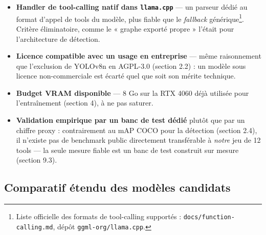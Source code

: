 \documentclass[11pt,a4paper]{article}
\let\Oldsubsection\subsection
\renewcommand{\subsection}{\FloatBarrier\Oldsubsection}
\begin{document}
    \begin{itemize}[leftmargin=1.5em]
      \item \textbf{Handler de tool-calling natif dans \texttt{llama.cpp}}
        --- un parseur dédié au format d'appel de tools du modèle, plus
        fiable que le \emph{fallback} générique\footnote{Liste officielle
        des formats de tool-calling supportés :
        \texttt{docs/function-calling.md}, dépôt
        \texttt{ggml-org/llama.cpp}.}. Critère éliminatoire, comme le «
        graphe exporté propre » l'était pour l'architecture de détection.
      \item \textbf{Licence compatible avec un usage en entreprise} ---
        même raisonnement que l'exclusion de YOLOv8n en AGPL-3.0
        (section 2.2) : un modèle sous licence non-commerciale est écarté
        quel que soit son mérite technique.
      \item \textbf{Budget VRAM disponible} --- 8 Go sur la RTX 4060 déjà
        utilisée pour l'entraînement (section 4), à ne pas saturer.
      \item \textbf{Validation empirique par un banc de test dédié} plutôt
        que par un chiffre proxy : contrairement au mAP COCO pour la
        détection (section 2.4), il n'existe pas de benchmark public
        directement transférable à \emph{notre} jeu de 12 tools --- la
        seule mesure fiable est un banc de test construit sur mesure
        (section 9.3).
    \end{itemize}
    
    \subsection{Comparatif étendu des modèles candidats}
    \label{sec:agent-comparatif}
    
\end{document}
